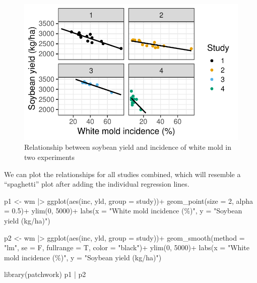 \documentclass[
  letterpaper,
  DIV=11,
  numbers=noendperiod]{scrreprt}
\newenvironment{Shaded}{\begin{snugshade}}{\end{snugshade}}
\newcommand{\AttributeTok}[1]{\textcolor[rgb]{0.40,0.45,0.13}{#1}}
\newcommand{\DecValTok}[1]{\textcolor[rgb]{0.68,0.00,0.00}{#1}}
\newcommand{\FloatTok}[1]{\textcolor[rgb]{0.68,0.00,0.00}{#1}}
\newcommand{\FunctionTok}[1]{\textcolor[rgb]{0.28,0.35,0.67}{#1}}
\newcommand{\NormalTok}[1]{\textcolor[rgb]{0.00,0.23,0.31}{#1}}
\newcommand{\OtherTok}[1]{\textcolor[rgb]{0.00,0.23,0.31}{#1}}
\newcommand{\SpecialCharTok}[1]{\textcolor[rgb]{0.37,0.37,0.37}{#1}}
\newcommand{\StringTok}[1]{\textcolor[rgb]{0.13,0.47,0.30}{#1}}
\begin{document}
\begin{figure}[H]

{\centering \includegraphics{yieldloss-concepts_files/figure-pdf/fig-damagecurve1-1.pdf}

}

\caption{\label{fig-damagecurve1}Relationship between soybean yield and
incidence of white mold in two experiments}

\end{figure}

We can plot the relationships for all studies combined, which will
resemble a ``spaghetti'' plot after adding the individual regression
lines.

\begin{Shaded}
\begin{Highlighting}[]
\NormalTok{p1 }\OtherTok{\textless{}{-}}\NormalTok{ wm }\SpecialCharTok{|\textgreater{}} 
  \FunctionTok{ggplot}\NormalTok{(}\FunctionTok{aes}\NormalTok{(inc, yld, }\AttributeTok{group =}\NormalTok{ study))}\SpecialCharTok{+}
  \FunctionTok{geom\_point}\NormalTok{(}\AttributeTok{size =} \DecValTok{2}\NormalTok{, }\AttributeTok{alpha =} \FloatTok{0.5}\NormalTok{)}\SpecialCharTok{+}
  \FunctionTok{ylim}\NormalTok{(}\DecValTok{0}\NormalTok{, }\DecValTok{5000}\NormalTok{)}\SpecialCharTok{+}
  \FunctionTok{labs}\NormalTok{(}\AttributeTok{x =} \StringTok{"White mold incidence (\%)"}\NormalTok{,}
       \AttributeTok{y =} \StringTok{"Soybean yield (kg/ha)"}\NormalTok{)}

\NormalTok{p2 }\OtherTok{\textless{}{-}}\NormalTok{ wm }\SpecialCharTok{|\textgreater{}} 
  \FunctionTok{ggplot}\NormalTok{(}\FunctionTok{aes}\NormalTok{(inc, yld, }\AttributeTok{group =}\NormalTok{ study))}\SpecialCharTok{+}
  \FunctionTok{geom\_smooth}\NormalTok{(}\AttributeTok{method =} \StringTok{"lm"}\NormalTok{, }\AttributeTok{se =}\NormalTok{ F, }\AttributeTok{fullrange =}\NormalTok{ T, }\AttributeTok{color =} \StringTok{"black"}\NormalTok{)}\SpecialCharTok{+}
  \FunctionTok{ylim}\NormalTok{(}\DecValTok{0}\NormalTok{, }\DecValTok{5000}\NormalTok{)}\SpecialCharTok{+}
  \FunctionTok{labs}\NormalTok{(}\AttributeTok{x =} \StringTok{"White mold incidence (\%)"}\NormalTok{,}
       \AttributeTok{y =} \StringTok{"Soybean yield (kg/ha)"}\NormalTok{)}

\FunctionTok{library}\NormalTok{(patchwork)}
\NormalTok{p1 }\SpecialCharTok{|}\NormalTok{ p2}
\end{Highlighting}
\end{Shaded}
\end{document}
